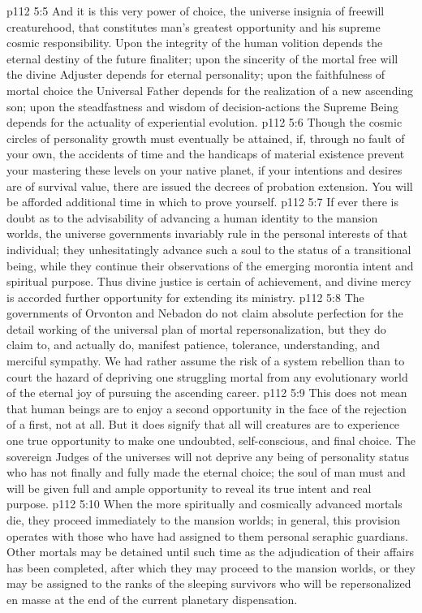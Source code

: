 \vs p112 5:5 And it is this very power of choice, the universe insignia of freewill creaturehood, that constitutes man’s greatest opportunity and his supreme cosmic responsibility. Upon the integrity of the human volition depends the eternal destiny of the future finaliter; upon the sincerity of the mortal free will the divine Adjuster depends for eternal personality; upon the faithfulness of mortal choice the Universal Father depends for the realization of a new ascending son; upon the steadfastness and wisdom of decision\hyp{}actions the Supreme Being depends for the actuality of experiential evolution.
\pc \vs p112 5:6 Though the cosmic circles of personality growth must eventually be attained, if, through no fault of your own, the accidents of time and the handicaps of material existence prevent your mastering these levels on your native planet, if your intentions and desires are of survival value, there are issued the decrees of probation extension. You will be afforded additional time in which to prove yourself.
\vs p112 5:7 If ever there is doubt as to the advisability of advancing a human identity to the mansion worlds, the universe governments invariably rule in the personal interests of that individual; they unhesitatingly advance such a soul to the status of a transitional being, while they continue their observations of the emerging morontia intent and spiritual purpose. Thus divine justice is certain of achievement, and divine mercy is accorded further opportunity for extending its ministry.
\vs p112 5:8 The governments of Orvonton and Nebadon do not claim absolute perfection for the detail working of the universal plan of mortal repersonalization, but they do claim to, and actually do, manifest patience, tolerance, understanding, and merciful sympathy. We had rather assume the risk of a system rebellion than to court the hazard of depriving one struggling mortal from any evolutionary world of the eternal joy of pursuing the ascending career.
\vs p112 5:9 This does not mean that human beings are to enjoy a second opportunity in the face of the rejection of a first, not at all. But it does signify that all will creatures are to experience one true opportunity to make one undoubted, self\hyp{}conscious, and final choice. The sovereign Judges of the universes will not deprive any being of personality status who has not finally and fully made the eternal choice; the soul of man must and will be given full and ample opportunity to reveal its true intent and real purpose.
\vs p112 5:10 When the more spiritually and cosmically advanced mortals die, they proceed immediately to the mansion worlds; in general, this provision operates with those who have had assigned to them personal seraphic guardians. Other mortals may be detained until such time as the adjudication of their affairs has been completed, after which they may proceed to the mansion worlds, or they may be assigned to the ranks of the sleeping survivors who will be repersonalized en masse at the end of the current planetary dispensation.
